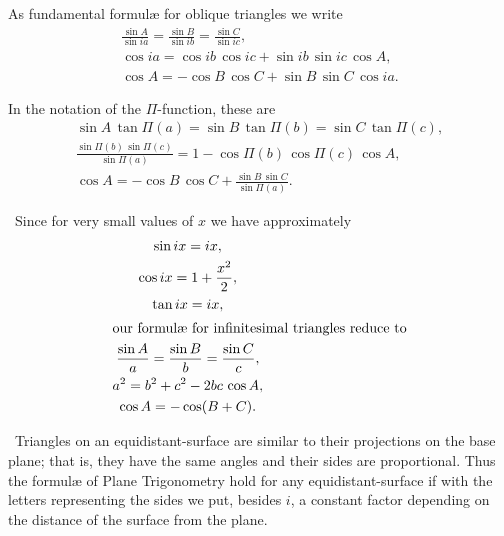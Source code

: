 \begin{description}
As fundamental formulæ for oblique triangles we write
\begin{gather*}
\frac{\sin A}{\sin ia} = \frac{\sin B}{\sin ib}
                       = \frac{\sin C}{\sin ic}, \\
\cos ia = \cos ib\, \cos ic + \sin ib\, \sin ic\, \cos A, \\
\cos A  = -\cos B\, \cos C + \sin B\, \sin C\, \cos ia.
\end{gather*}

In the notation of the $\Pi$-function, these are
\begin{gather*}
\sin A\, \tan\Pi(a) = \sin B\, \tan\Pi(b) = \sin C\, \tan\Pi(c), \\
\frac{\sin\Pi(b)\,\sin\Pi(c)}{\sin\Pi(a)} =
                             1-\cos\Pi(b)\,\cos\Pi(c)\,\cos A, \\
\cos A = -\cos B\, \cos C + \frac{\sin B\,\sin C}{\sin\Pi(a)}.
\end{gather*}

\item[5.]~Since for very small values of $x$ we have approximately
\begin{gather*}
\sin ix = ix, \\
\cos ix = 1 + \frac{x^2}{2}, \\
\tan ix = ix, \\
\intertext{our formulæ for infinitesimal triangles reduce to}
\frac{\sin A}{a} = \frac{\sin B}{b} = \frac{\sin C}{c}, \\
a^2 = b^2 + c^2 - 2bc\,\cos A, \\
\cos A = -\cos(B+C).
\end{gather*}

\item[6.]~Triangles on an equidistant-surface are similar to their
projections on the base plane; that is, they have the same angles
and their sides are proportional. Thus the formulæ of Plane
Trigonometry hold for any equidistant-surface if with the letters
representing the sides we put, besides $i$, a constant factor
depending on the distance of the surface from the plane.
\end{description}

